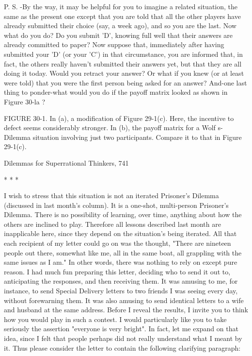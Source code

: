            P. S. -By the way, it may be helpful for you to imagine a related
  situation, the same as the present one except that you are told that all the other
  players have already submitted their choice (say, a week ago), and so you are
  the last. Now what do you do? Do you submit 'D', knowing full well that their
  answers are already committed to paper? Now suppose that, immediately after
  having submitted your 'D' (or your 'C') in that circumstance, you are informed
  that, in fact, the others really haven't submitted their answers yet, but that they
  are all doing it today. Would you retract your answer? Or what if you knew (or
  at least were told) that you were the first person being asked for an answer?
           And-one last thing to ponder-what would you do if the payoff matrix
  looked as shown in Figure 30-la ?

        FIGURE 30-1. In (a), a modification of Figure 29-1(c). Here, the incentive to
defect seems considerably stronger. In (b), the payoff matrix for a Wolf s-Dilemma
situation involving just two participants. Compare it to that in Figure 29-1(c).




Dilemmas for Superrational Thinkers,                                                741

                                    *      *       *

         I wish to stress that this situation is not an iterated Prisoner's Dilemma
(discussed in last month's column). It is a one-shot, multi-person Prisoner's Dilemma.
There is no possibility of learning, over time, anything about how the others are
inclined to play. Therefore all lessons described last month are inapplicable here,
since they depend on the situation's being iterated. All that each recipient of my letter
could go on was the thought, "There are nineteen people out there, somewhat like me,
all in the same boat, all grappling with the same issues as I am." In other words, there
was nothing to rely on except pure reason.
         I had much fun preparing this letter, deciding who to send it out to,
anticipating the responses, and then receiving them. It was amusing to me, for
instance, to send Special Delivery letters to two friends I was seeing every day,
without forewarning them. It was also amusing to send identical letters to a wife and
husband at the same address.
         Before I reveal the results, I invite you to think how you would play in such a
contest. I would particularly like you to take seriously the assertion "everyone is very
bright". In fact, let me expand on that idea, since I felt that people perhaps did not
really understand what I meant by it. Thus please consider the letter to contain the
following clarifying paragraph:

